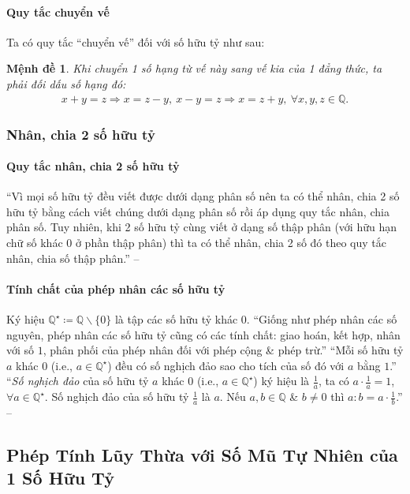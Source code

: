 \documentclass{article}
\numberwithin{equation}{section}
\newtheorem{menhde}{Mệnh đề}[section]
\begin{document}
\paragraph{Quy tắc chuyển vế}
Ta có quy tắc ``chuyển vế'' đối với số hữu tỷ như sau:

\begin{menhde}
	Khi chuyển 1 số hạng từ vế này sang vế kia của 1 đẳng thức, ta phải đối dấu số hạng đó:
	\begin{align*}
		x + y = z\Rightarrow x = z - y,\ x - y = z\Rightarrow x = z + y,\ \forall x,y,z\in\mathbb{Q}.
	\end{align*}
\end{menhde}

\subsubsection{Nhân, chia 2 số hữu tỷ}

\paragraph{Quy tắc nhân, chia 2 số hữu tỷ}
``Vì mọi số hữu tỷ đều viết được dưới dạng phân số nên ta có thể nhân, chia 2 số hữu tỷ bằng cách viết chúng dưới dạng phân số rồi áp dụng quy tắc nhân, chia phân số. Tuy nhiên, khi 2 số hữu tỷ cùng viết ở dạng số thập phân (với hữu hạn chữ số khác $0$ ở phần thập phân) thì ta có thể nhân, chia 2 số đó theo quy tắc nhân, chia số thập phân.'' -- \cite[p. 14]{SGK_Toan_7_Canh_Dieu_tap_1}

\paragraph{Tính chất của phép nhân các số hữu tỷ}
Ký hiệu $\mathbb{Q}^\star\coloneqq\mathbb{Q}\backslash\{0\}$ là tập các số hữu tỷ khác $0$. ``Giống như phép nhân các số nguyên, phép nhân các số hữu tỷ cũng có các tính chất: giao hoán, kết hợp, nhân với số $1$, phân phối của phép nhân đối với phép cộng \& phép trừ.'' ``Mỗi số hữu tỷ $a$ khác $0$ (i.e., $a\in\mathbb{Q}^\star$) đều có số nghịch đảo sao cho tích của số đó với $a$ bằng $1$.'' ``\textit{Số nghịch đảo} của số hữu tỷ $a$ khác $0$ (i.e., $a\in\mathbb{Q}^\star$) ký hiệu là $\frac{1}{a}$, ta có $a\cdot\frac{1}{a} = 1$, $\forall a\in\mathbb{Q}^\star$. Số nghịch đảo của số hữu tỷ $\frac{1}{a}$ là $a$. Nếu $a,b\in\mathbb{Q}$ \& $b\ne 0$ thì $a:b = a\cdot\frac{1}{b}$.'' -- \cite[p. 15]{SGK_Toan_7_Canh_Dieu_tap_1}

\subsection{Phép Tính Lũy Thừa với Số Mũ Tự Nhiên của 1 Số Hữu Tỷ}
\end{document}
